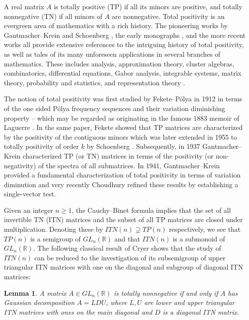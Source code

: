 \documentclass[11pt,reqno]{amsart}
\theoremstyle{plain}
\newtheorem{lemma}[theorem]{Lemma}
\theoremstyle{definition}
\numberwithin{equation}{section}
\begin{document}
A real matrix $A$ is totally positive (TP) if all its minors are positive, and  totally nonnegative (TN) if all minors of $A$ are nonnegative. Total positivity is an evergreen area of mathematics with a rich history.  The pioneering works by Gantmacher--Krein \cite{gantmacher-krein} and Schoenberg \cite{S55}, the early monographs \cite{GK50, K68}, and the more recent works \cite{FZ02,fallat-john,GM96,pinkus} all provide extensive references to the intriguing history of total positivity, as well as tales of its many unforeseen applications in several branches of mathematics. These includes analysis, approximation theory, cluster algebras, combinatorics, differential equations, Gabor analysis, integrable systems, matrix theory, probability and statistics, and
representation theory
\cite{BFZ96,Bre95,fallat-john,FZ02,GRS18,K68,KW14,Lu94,pinkus,Ri03,Sch07}.

The notion of total positivity was first studied by Fekete--P\'olya \cite{FP12} in 1912 in terms of the  one sided P\'olya frequency sequences and their variation diminishing property -- which may be regarded as originating in the famous 1883 memoir of Laguerre \cite{Laguerre}. In the same paper, Fekete showed that TP matrices are characterized by the positivity of the contiguous minors which was later extended in 1955 to totally positivity of order $k$ by Schoenberg \cite{S55}. Subsequently, in 1937 Gantmacher--Krein \cite{gantmacher-krein} characterized TP (or TN)  matrices in terms of  the positivity (or non-negativity) of the spectra of all submatrices. In 1941, Gantmacher--Krein \cite{GK50} provided a fundamental characterization of total positivity in terms of variation diminution and very recently Choudhury \cite{C22} refined these results by establishing a single-vector test.

Given an integer $n \geq 1$, the Cauchy--Binet formula implies that the set of all invertible TN (ITN) matrices and the subset of all TP matrices are closed under multiplication. Denoting these by $ITN(n) \supsetneq TP(n)$ respectively, we see that $TP(n)$ is a semigroup of $GL_n(\mathbb{R})$ and that $ITN(n)$ is a submonoid of $GL_n(\mathbb{R})$. The following classical result of Cryer \cite{C1, C2}  shows that the study of $ITN(n)$ can be reduced to the investigation of its subsemigroup of upper triangular ITN matrices with one on the diagonal and subgroup of diagonal ITN matrices:

\begin{lemma}
	A matrix $A\in GL_n(\mathbb{R})$ is totally nonnegative if and only if $A$ has Gaussian decomposition $A=LDU$, where $L,U$ are lower and upper triangular ITN matrices with ones on the main diagonal and $D$ is a diagonal ITN matrix.
\end{lemma}
\end{document}
